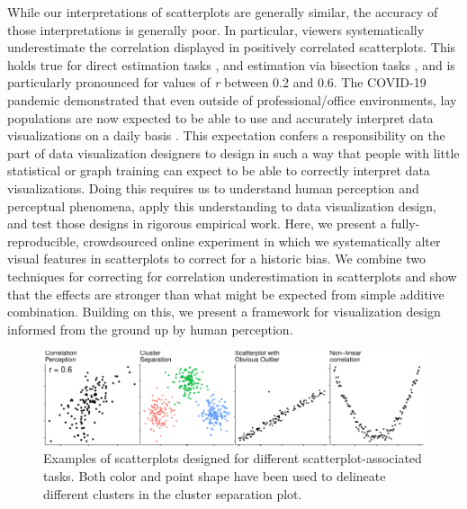 \documentclass[manuscript, review, anonymous, screen]{acmart}
\begin{document}
While our interpretations of scatterplots are generally similar, the
accuracy of those interpretations is generally poor. In particular,
viewers systematically underestimate the correlation displayed in
positively correlated scatterplots. This holds true for direct
estimation tasks
\citep{strahan_1978, bobko_1979, cleveland_1982, lane_1985, lauer_1989, collyer_1990, meyer_1992},
and estimation via bisection tasks \citep{rensink_2017}, and is
particularly pronounced for values of \emph{r} between 0.2 and 0.6. The
COVID-19 pandemic demonstrated that even outside of professional/office
environments, lay populations are now expected to be able to use and
accurately interpret data visualizations on a daily basis
\citep{bbc_2022}. This expectation confers a responsibility on the part
of data visualization designers to design in such a way that people with
little statistical or graph training can expect to be able to correctly
interpret data visualizations. Doing this requires us to understand
human perception and perceptual phenomena, apply this understanding to
data visualization design, and test those designs in rigorous empirical
work. Here, we present a fully-reproducible, crowdsourced online
experiment in which we systematically alter visual features in
scatterplots to correct for a historic bias. We combine two techniques
for correcting for correlation underestimation in scatterplots and show
that the effects are stronger than what might be expected from simple
additive combination. Building on this, we present a framework for
visualization design informed from the ground up by human perception.

\begin{figure}

{\centering \includegraphics[width=1\textwidth,height=\textheight]{size_and_contrast_files/figure-pdf/fig-tasks-1.pdf}

}

\caption{\label{fig-tasks}Examples of scatterplots designed for
different scatterplot-associated tasks. Both color and point shape have
been used to delineate different clusters in the cluster separation
plot.}
\end{figure}
\end{document}
